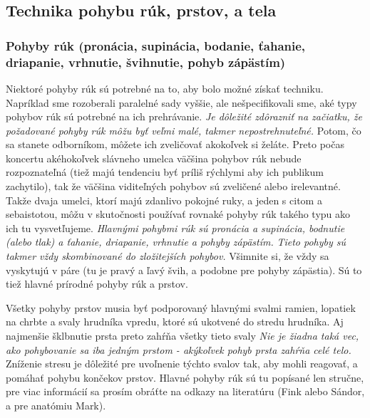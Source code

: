 \subsection{Technika pohybu rúk, prstov, a tela}
\subsubsection{Pohyby rúk (pronácia, supinácia, bodanie, ťahanie, driapanie, vrhnutie, švihnutie, pohyb zápästím)}
Niektoré pohyby rúk sú potrebné na to, aby bolo možné získať techniku. Napríklad sme rozoberali paralelné sady vyššie, ale nešpecifikovali sme, aké typy pohybov rúk sú potrebné na ich prehrávanie. \emph{Je dôležité zdôrazniť na začiatku, že požadované pohyby rúk môžu byť veľmi malé, takmer nepostrehnuteľné.} Potom, čo sa stanete odborníkom, môžete ich zveličovať akokoľvek si želáte. Preto počas koncertu akéhokoľvek slávneho umelca väčšina pohybov rúk nebude rozpoznateľná (tiež majú tendenciu byť príliš rýchlymi aby ich publikum zachytilo), tak že väčšina viditeľných pohybov sú zveličené alebo irelevantné. Takže dvaja umelci, ktorí majú  zdanlivo pokojné ruky, a jeden s citom a sebaistotou, môžu v skutočnosti používať rovnaké pohyby rúk takého typu ako ich tu vysvetľujeme. \emph{Hlavnými pohybmi rúk sú pronácia a supinácia, bodnutie (alebo tlak) a ťahanie, driapanie, vrhnutie a pohyby zápästím.} \emph{Tieto pohyby sú takmer vždy skombinované do zložitejších pohybov.} Všimnite si, že vždy sa vyskytujú v páre (tu je pravý a ľavý švih, a podobne pre pohyby zápästia). Sú to tiež hlavné prírodné pohyby rúk a prstov. 

Všetky pohyby prstov musia byť podporovaný hlavnými svalmi ramien, lopatiek na chrbte a svaly hrudníka vpredu, ktoré sú ukotvené do stredu hrudníka. Aj najmenšie šklbnutie prsta preto zahŕňa všetky tieto svaly \emph{Nie je žiadna taká vec, ako pohybovanie sa iba jedným prstom - akýkoľvek pohyb prsta zahŕňa celé telo.} Zníženie stresu je dôležité pre uvoľnenie týchto svalov tak, aby mohli reagovať, a pomáhať pohybu končekov prstov. Hlavné pohyby rúk sú tu popísané len stručne, pre viac informácií sa prosím obráťte na odkazy na literatúru (Fink alebo Sándor, a pre anatómiu Mark). 

